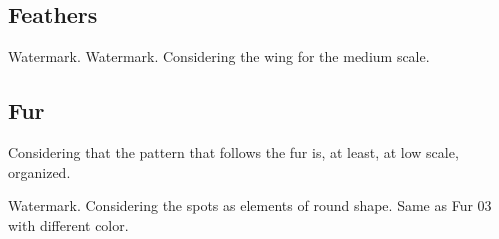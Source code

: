 \documentclass[12pt,a4paper]{article}
\begin{document}
\begin{singlespace}
\clearpage
\renewcommand{\mat}{Feathers}
\subsection{\mat}

\renewcommand{\Number}{01}\InputImage{\sexor}{\tbu}{\sexor}{\tbu}{\sro}{\tfe}
{Watermark.}{}
\renewcommand{\Number}{02}\InputImage{\sexor}{\tbu}{\sexor}{\tbu}{\sro}{\tfe} 
{}{}
\renewcommand{\Number}{03}\InputImage{\sexor}{\tbu}{\sexor}{\tbu}{\sro}{\tfe} 
{}{}
\renewcommand{\Number}{04}\InputImage{\sexor}{\tbu}{\sexor}{\tbu}{\sexdi}{\tfe}
{}{}
\renewcommand{\Number}{05}\InputImage{\sexor}{\tbu}{\sro}{\tfe}{\sro}{\tfe}
{Watermark.}{}
\renewcommand{\Number}{06}\InputImage{\sfl}{\tsm}{\sro}{\tfe}{\sro}{\tfe}
{}{}
\renewcommand{\Number}{07}\InputImage{\sexor}{\tbu}{\sexdi}{\tfe}{\sexdi}{\tfe}
{}{}
\renewcommand{\Number}{08}\InputImage{\sexor}{\tbu}{\sexor}{\tbu}{\sexdi}{\tfe}
{}{}
\renewcommand{\Number}{09}\InputImage{\sexor}{\tbu}{\sexor}{\tbu}{\sexdi}{\tfe}
{}{}
\renewcommand{\Number}{10}\InputImage{\sfl}{\tsm}{\sro}{\tfe}{\sro}{\tfe}
{}{Considering the wing for the medium scale.}
\renewcommand{\Number}{11}\InputImage{\sexor}{\tbu}{\sexor}{\tfe}{\sexor}{\tfe}
{}{}
\renewcommand{\Number}{12}\InputImage{\sexor}{\tbu}{\sro}{\tfe}{\sro}{\tfe}
{}{}

\clearpage
\renewcommand{\mat}{Fur}
\subsection{\mat}
Considering that the pattern that follows the fur is, at least, at low scale, organized.

\renewcommand{\Number}{01}\InputImage{\sexor}{\tfu}{\sexor}{\tfu}{\sexdi}{\tfu}
{Watermark.}{}
\renewcommand{\Number}{02}\InputImage{\sexor}{\tfu}{\sexor}{\tfu}{\sexdi}{\tfu}
{}{}
\renewcommand{\Number}{03}\InputImage{\sexor}{\tfu}{\sexor}{\tfu}{\sro}{\tfu}
{}{Considering the spots as elements of round shape.}
\renewcommand{\Number}{04}\InputImage{\sexor}{\tfu}{\sexor}{\tfu}{\sexor}{\tfu}
{}{}
\renewcommand{\Number}{05}\InputImage{\sexor}{\tfu}{\sexor}{\tfu}{\sexdi}{\tfu}
{}{}
\renewcommand{\Number}{06}\InputImage{\sexor}{\tfu}{\sexor}{\tfu}{\sexdi}{\tfu}
{}{}
\renewcommand{\Number}{07}\InputImage{\sexor}{\tfu}{\sexdi}{\tfu}{\sexdi}{\tfu}
{}{}
\renewcommand{\Number}{08}\InputImage{\sexor}{\tfu}{\sexor}{\tfu}{\sexdi}{\tfu}
{}{}
\renewcommand{\Number}{09}\InputImage{\sexor}{\tfu}{\sexdi}{\tfu}{\sexdi}{\tfu}
{}{}
\renewcommand{\Number}{10}\InputImage{\sexor}{\tfu}{\sexor}{\tfu}{\sexdi}{\tfu}
{}{}
\renewcommand{\Number}{11}\InputImage{\sexor}{\tfu}{\sexor}{\tfu}{\sro}{\tfu}
{Same as Fur 03 with different color.}{}
\renewcommand{\Number}{12}\InputImage{\sexor}{\tfu}{\sexor}{\tfu}{\sexdi}{\tfu}
{}{}


\end{singlespace}
\end{document}
